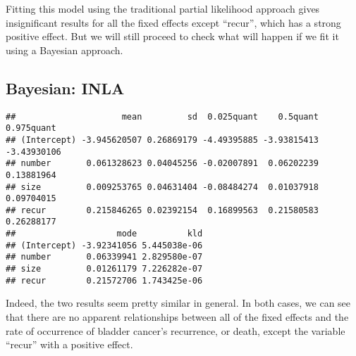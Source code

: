 \documentclass[]{article}
\newenvironment{Shaded}{\begin{snugshade}}{\end{snugshade}}
\newcommand{\DataTypeTok}[1]{\textcolor[rgb]{0.13,0.29,0.53}{#1}}
\newcommand{\DecValTok}[1]{\textcolor[rgb]{0.00,0.00,0.81}{#1}}
\newcommand{\KeywordTok}[1]{\textcolor[rgb]{0.13,0.29,0.53}{\textbf{#1}}}
\newcommand{\NormalTok}[1]{#1}
\newcommand{\OperatorTok}[1]{\textcolor[rgb]{0.81,0.36,0.00}{\textbf{#1}}}
\newcommand{\OtherTok}[1]{\textcolor[rgb]{0.56,0.35,0.01}{#1}}
\newcommand{\StringTok}[1]{\textcolor[rgb]{0.31,0.60,0.02}{#1}}
\begin{document}
Fitting this model using the traditional partial likelihood approach
gives insignificant results for all the fixed effects except ``recur'',
which has a strong positive effect. But we will still proceed to check
what will happen if we fit it using a Bayesian approach.

\hypertarget{bayesian-inla-1}{%
\subsection{Bayesian: INLA}\label{bayesian-inla-1}}

\begin{Shaded}
\end{Shaded}

\begin{verbatim}
##                     mean         sd  0.025quant    0.5quant  0.975quant
## (Intercept) -3.945620507 0.26869179 -4.49395885 -3.93815413 -3.43930106
## number       0.061328623 0.04045256 -0.02007891  0.06202239  0.13881964
## size         0.009253765 0.04631404 -0.08484274  0.01037918  0.09704015
## recur        0.215846265 0.02392154  0.16899563  0.21580583  0.26288177
##                    mode          kld
## (Intercept) -3.92341056 5.445038e-06
## number       0.06339941 2.829580e-07
## size         0.01261179 7.226282e-07
## recur        0.21572706 1.743425e-06
\end{verbatim}

Indeed, the two results seem pretty similar in general. In both cases,
we can see that there are no apparent relationships between all of the
fixed effects and the rate of occurrence of bladder cancer's recurrence,
or death, except the variable ``recur'' with a positive effect.
\end{document}
